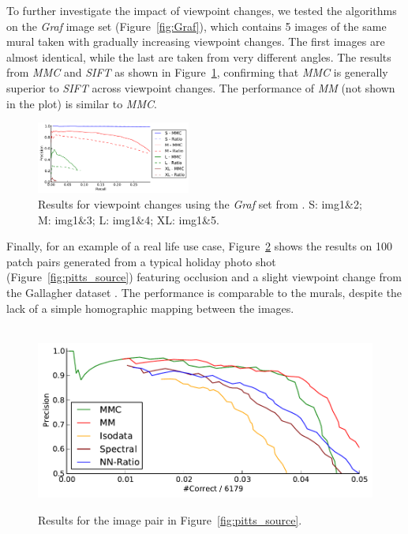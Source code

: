 \documentclass[conference]{IEEEtran}
\begin{document}
To further investigate the impact of viewpoint changes, we tested the 
algorithms on the \emph{Graf} image set (Figure~\ref{fig:Graf}), which 
contains 5 images of the same mural taken with gradually increasing 
viewpoint changes.  The first images are almost identical, while the 
last are taken from very different angles. The results from   \emph{MMC} 
and \emph{SIFT} as shown in Figure~\ref{fig:result_viewpoint}, 
confirming that \emph{MMC} is generally superior to \emph{SIFT} across 
viewpoint changes.
The performance of \emph{MM} (not shown in the plot) is similar to 
\emph{MMC}.

\begin{figure}[htb]
	\centering
	\includegraphics[width=0.45\textwidth]{images/result_viewpoint}
	\caption{Results for viewpoint changes using the \emph{Graf} set from 
		\cite{mikolajczyk2005performance}.  S: img1\&2; M: img1\&3; L: img1\&4; XL: img1\&5.}
	\label{fig:result_viewpoint}
\end{figure}


Finally, for an example of a real life use case, Figure~\ref{fig:result_pitts} 
shows the results on 100 patch pairs generated 
from a typical holiday photo shot (Figure~\ref{fig:pitts_source}) featuring occlusion and a slight viewpoint 
change from the Gallagher dataset \cite{gallagher2008}.  The performance is comparable to the murals, despite the lack of a simple homographic mapping between the images.


\begin{figure}[htb]
		~%
			\centering
			\includegraphics[width=0.6\columnwidth]{images/result_pitts}
	\caption{Results for the image pair in Figure~\ref{fig:pitts_source}.}
	\label{fig:result_pitts}
\end{figure}
\end{document}
